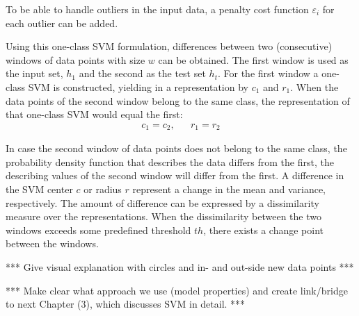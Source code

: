 To be able to handle outliers in the input data, a penalty cost function $\varepsilon_i$ for each outlier can be added.

Using this one-class SVM formulation, differences between two (consecutive) windows of data points with size $w$ can be obtained.
The first window is used as the input set, $h_1$ and the second as the test set $h_t$.
For the first window a one-class SVM is constructed, yielding in a representation by $c_1$ and $r_1$.
When the data points of the second window belong to the same class, the representation of that one-class SVM would equal the first:
\begin{equation}
\begin{aligned}
  c_1 = c_2, & &  r_1 = r_2
\end{aligned}
\end{equation}

In case the second window of data points does not belong to the same class, \ie the probability density function that describes the data differs from the first, the describing values of the second window will differ from the first.
A difference in the SVM center $c$ or radius $r$ represent a change in the mean and variance, respectively.
The amount of difference can be expressed by a dissimilarity measure over the representations.
When the dissimilarity between the two windows exceeds some predefined threshold $th$, there exists a change point between the windows.

*** Give visual explanation with circles and in- and out-side new data points ***

*** Make clear what approach we use (model properties) and create link/bridge to next Chapter (3), which discusses SVM in detail. ***